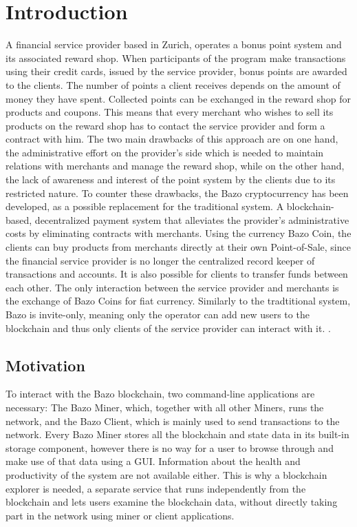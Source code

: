 \chapter{Introduction}
A financial service provider based in Zurich, operates a bonus point system and its associated reward shop. When participants of the program make transactions using their credit cards, issued by the service provider, bonus points are awarded to the clients. The number of points a client receives depends on the amount of money they have spent. Collected points can be exchanged in the reward shop for products and coupons. This means that every merchant who wishes to sell its products on the reward shop has to contact the service provider and form a contract with him. The two main drawbacks of this approach are on one hand, the administrative effort on the provider's side which is needed to maintain relations with merchants and manage the reward shop, while on the other hand, the lack of awareness and interest of the point system by the clients due to its restricted nature.
To counter these drawbacks, the Bazo cryptocurrency has been developed, as a possible replacement for the traditional system. A blockchain-based, decentralized payment system that alleviates the provider's administrative costs by eliminating contracts with merchants. Using the currency Bazo Coin, the clients can buy products from merchants directly at their own Point-of-Sale, since the financial service provider is no longer the centralized record keeper of transactions and accounts. It is also possible for clients to transfer funds between each other. The only interaction between the service provider and merchants is the exchange of Bazo Coins for fiat currency. Similarly to the tradtitional system, Bazo is invite-only, meaning only the operator can add new users to the blockchain and thus only clients of the service provider can interact with it. \cite{bazo}.

\section{Motivation}
To interact with the Bazo blockchain, two command-line applications are necessary: The Bazo Miner, which, together with all other Miners, runs the network, and the Bazo Client, which is mainly used to send transactions to the network. Every Bazo Miner stores all the blockchain and state data in its built-in storage component, however there is no way for a user to browse through and make use of that data using a GUI. Information about the health and productivity of the system are not available either. This is why a blockchain explorer is needed, a separate service that runs independently from the blockchain and lets users examine the blockchain data, without directly taking part in the network using miner or client applications.

